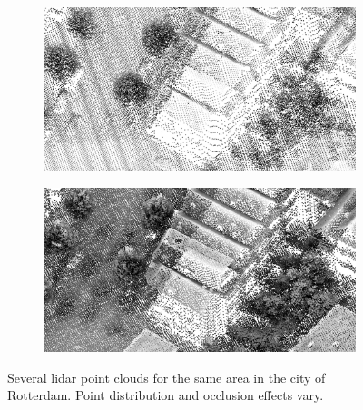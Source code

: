 \begin{figure}
	\begin{subfigure}{0.45\linewidth}
		\includegraphics[width=\textwidth]{figs/ahn3_d.png}
		\label{fig:pcd:ahn3}
	\end{subfigure}
	\quad
	\begin{subfigure}{0.45\linewidth}
		\includegraphics[width=\textwidth]{figs/rdam16_d.png}
		\label{fig:pcd:rdam16}
	\end{subfigure}
	\caption{Several lidar point clouds for the same area in the city of Rotterdam. Point distribution and occlusion effects vary.}%
\label{fig:pcd}
\end{figure}

